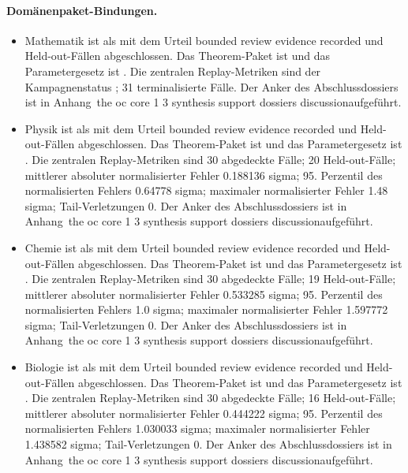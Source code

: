 \paragraph{Domänenpaket-Bindungen.}
\begin{itemize}[leftmargin=1.6em,nosep]
\item Mathematik ist als  mit dem Urteil bounded review evidence recorded und  Held-out-Fällen abgeschlossen. Das Theorem-Paket ist  und das Parametergesetz ist . Die zentralen Replay-Metriken sind der Kampagnenstatus ; 31 terminalisierte Fälle. Der Anker des Abschlussdossiers ist in Anhang~the oc core 1 3 synthesis support dossiers discussionaufgeführt.
\item Physik ist als  mit dem Urteil bounded review evidence recorded und  Held-out-Fällen abgeschlossen. Das Theorem-Paket ist  und das Parametergesetz ist . Die zentralen Replay-Metriken sind 30 abgedeckte Fälle; 20 Held-out-Fälle; mittlerer absoluter normalisierter Fehler 0.188136 sigma; 95. Perzentil des normalisierten Fehlers 0.64778 sigma; maximaler normalisierter Fehler 1.48 sigma; Tail-Verletzungen 0. Der Anker des Abschlussdossiers ist in Anhang~the oc core 1 3 synthesis support dossiers discussionaufgeführt.
\item Chemie ist als  mit dem Urteil bounded review evidence recorded und  Held-out-Fällen abgeschlossen. Das Theorem-Paket ist  und das Parametergesetz ist . Die zentralen Replay-Metriken sind 30 abgedeckte Fälle; 19 Held-out-Fälle; mittlerer absoluter normalisierter Fehler 0.533285 sigma; 95. Perzentil des normalisierten Fehlers 1.0 sigma; maximaler normalisierter Fehler 1.597772 sigma; Tail-Verletzungen 0. Der Anker des Abschlussdossiers ist in Anhang~the oc core 1 3 synthesis support dossiers discussionaufgeführt.
\item Biologie ist als  mit dem Urteil bounded review evidence recorded und  Held-out-Fällen abgeschlossen. Das Theorem-Paket ist  und das Parametergesetz ist . Die zentralen Replay-Metriken sind 30 abgedeckte Fälle; 16 Held-out-Fälle; mittlerer absoluter normalisierter Fehler 0.444222 sigma; 95. Perzentil des normalisierten Fehlers 1.030033 sigma; maximaler normalisierter Fehler 1.438582 sigma; Tail-Verletzungen 0. Der Anker des Abschlussdossiers ist in Anhang~the oc core 1 3 synthesis support dossiers discussionaufgeführt.

\end{itemize}
